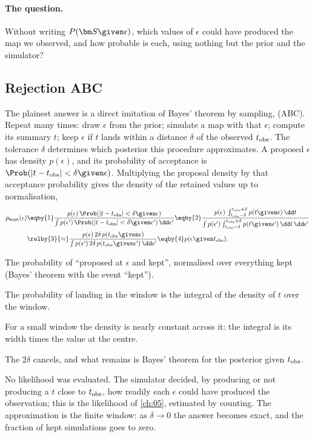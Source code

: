 \paragraph{The question.} Without writing $P(\bm S\given\epsilon)$, which values of $\epsilon$ could have produced the map we observed,
and how probable is each, using nothing but the prior and the simulator?

\subsection{Rejection ABC}
\label{12c:sec:rejection}

The plainest answer is a direct imitation of Bayes' theorem by sampling,  (ABC). Repeat
many times: draw $\epsilon$ from the prior; simulate a map with that $\epsilon$; compute its summary $t$; keep $\epsilon$ if $t$ lands
within a distance $\delta$ of the observed $t_{\rm obs}$. The tolerance $\delta$ determines which posterior this procedure approximates.
A proposed $\epsilon$ has density $p(\epsilon)$, and its probability of acceptance
is $\Prob(|t-t_{\rm obs}|<\delta\given\epsilon)$. Multiplying the proposal density
by that acceptance probability gives the density of the retained values up to normalisation,
\begin{align}
  p_{\rm kept}(\epsilon)
  &\eqby{1}\frac{p(\epsilon)\,\Prob(|t-t_{\rm obs}|<\delta\given\epsilon)}{\int p(\epsilon')\,\Prob(|t-t_{\rm obs}|<\delta\given\epsilon')\,\dd\epsilon'}
   \eqby{2}\frac{p(\epsilon)\,\int_{t_{\rm obs}-\delta}^{t_{\rm obs}+\delta}p(t\given\epsilon)\,\dd t}
               {\int p(\epsilon')\int_{t_{\rm obs}-\delta}^{t_{\rm obs}+\delta}p(t\given\epsilon')\,\dd t\,\dd\epsilon'}\nonumber\\
  &\relby{3}{\approx}\frac{p(\epsilon)\,2\delta\,p(t_{\rm obs}\given\epsilon)}{\int p(\epsilon')\,2\delta\,p(t_{\rm obs}\given\epsilon')\,\dd\epsilon'}
   \eqby{4}p(\epsilon\given t_{\rm obs}) .
  \label{12c:eq:abc}
\end{align}
\begin{explain}
  \item The probability of ``proposed at $\epsilon$ and kept'', normalised over everything kept (Bayes' theorem with the event
        ``kept'').
  \item The probability of landing in the window is the integral of the density of $t$ over the window.
  \item For a small window the density is nearly constant across it: the integral is its width times the value at the centre.
  \item The $2\delta$ cancels, and what remains is Bayes' theorem for the posterior given $t_{\rm obs}$.
\end{explain}
No likelihood was evaluated. The simulator decided, by producing or not producing a $t$ close to $t_{\rm obs}$, how readily each
$\epsilon$ could have produced the observation; this is the likelihood of \cref{ch:05}, estimated by counting. The approximation
is the finite window: as $\delta\to0$ the answer becomes exact, and the fraction of kept simulations goes to zero.

